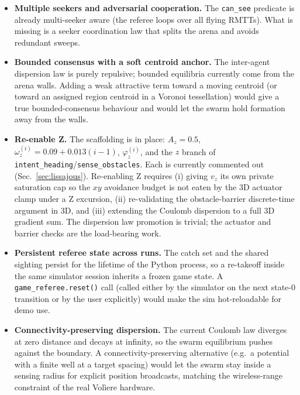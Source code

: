 \documentclass[11pt,a4paper]{article}
\newcommand{\code}[1]{\texttt{#1}}
\begin{document}
\begin{itemize}[leftmargin=1.4em]
  \item \textbf{Multiple seekers and adversarial cooperation.} The
        \code{can\_see} predicate is already multi-seeker aware (the referee
        loops over all flying RMTTs). What is missing is a seeker
        coordination law that splits the arena and avoids redundant sweeps.
  \item \textbf{Bounded consensus with a soft centroid anchor.} The
        inter-agent dispersion law is purely repulsive; bounded equilibria
        currently come from the arena walls. Adding a weak attractive term
        toward a moving centroid (or toward an assigned region centroid in
        a Voronoi tessellation) would give a true bounded-consensus
        behaviour and would let the swarm hold formation away from the
        walls.
  \item \textbf{Re-enable Z.} The scaffolding is in place: $A_z = 0.5$,
        $\omega_z^{(i)} = 0.09 + 0.013(i-1)$, $\varphi_z^{(i)}$, and the
        $z$ branch of \code{intent\_heading}/\code{sense\_obstacles}. Each
        is currently commented out (Sec.~\ref{sec:lissajous}). Re-enabling
        Z requires (i) giving $v_z$ its own private saturation cap so the
        $xy$ avoidance budget is not eaten by the 3D actuator clamp under
        a Z excursion, (ii) re-validating the obstacle-barrier discrete-time
        argument in 3D, and (iii) extending the Coulomb dispersion to a
        full 3D gradient sum. The dispersion law promotion is trivial; the
        actuator and barrier checks are the load-bearing work.
  \item \textbf{Persistent referee state across runs.} The catch set and
        the shared sighting persist for the lifetime of the Python process,
        so a re-takeoff inside the same simulator session inherits a
        frozen game state. A \code{game\_referee.reset()} call (called
        either by the simulator on the next state-0 transition or by the
        user explicitly) would make the sim hot-reloadable for demo use.
  \item \textbf{Connectivity-preserving dispersion.} The current Coulomb
        law diverges at zero distance and decays at infinity, so the
        swarm equilibrium pushes against the boundary. A
        connectivity-preserving alternative (e.g.\ a potential with a
        finite well at a target spacing) would let the swarm stay inside
        a sensing radius for explicit position broadcasts, matching the
        wireless-range constraint of the real Vol\`iere hardware.
\end{itemize}
\end{document}
